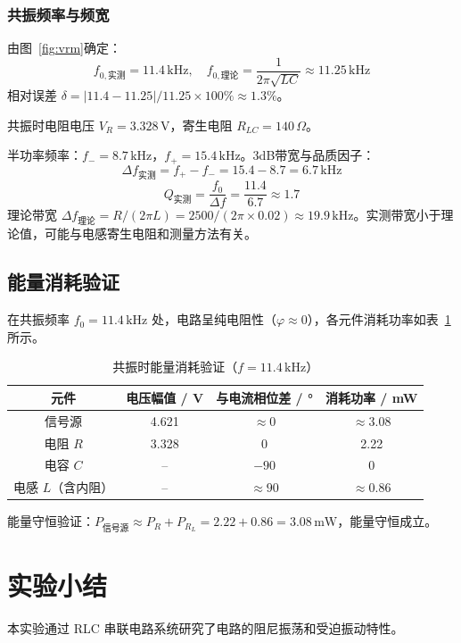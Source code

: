 \documentclass[UTF8]{article}
\begin{document}
\subsubsection{共振频率与频宽}

由图~\ref{fig:vrm}确定：
\[
f_{0,\text{实测}} = 11.4\,\mathrm{kHz}, \quad f_{0,\text{理论}} = \frac{1}{2\pi\sqrt{LC}} \approx 11.25\,\mathrm{kHz}
\]
相对误差 $\delta = |11.4 - 11.25|/11.25 \times 100\% \approx 1.3\%$。

共振时电阻电压 $V_R = 3.328\,\mathrm{V}$，寄生电阻 $R_{LC} = 140\,\Omega$。

半功率频率：$f_- = 8.7\,\mathrm{kHz}$，$f_+ = 15.4\,\mathrm{kHz}$。3dB带宽与品质因子：
\[
\Delta f_{\text{实测}} = f_+ - f_- = 15.4 - 8.7 = 6.7\,\mathrm{kHz}
\]
\[
Q_{\text{实测}} = \frac{f_0}{\Delta f} = \frac{11.4}{6.7} \approx 1.7
\]
理论带宽 $\Delta f_{\text{理论}} = R/(2\pi L) = 2500/(2\pi \times 0.02) \approx 19.9\,\mathrm{kHz}$。实测带宽小于理论值，可能与电感寄生电阻和测量方法有关。

\subsection{能量消耗验证}

在共振频率 $f_0 = 11.4\,\mathrm{kHz}$ 处，电路呈纯电阻性（$\varphi \approx 0$），各元件消耗功率如表~\ref{tab:energy}所示。

\begin{table}[h]
\centering
\caption{共振时能量消耗验证（$f = 11.4\,\mathrm{kHz}$）}
\label{tab:energy}
\begin{tabular}{cccc}
\toprule
元件 & 电压幅值 / V & 与电流相位差 / ° & 消耗功率 / mW \\
\midrule
信号源 & 4.621 & $\approx 0$ & $\approx 3.08$ \\
电阻 $R$ & 3.328 & 0 & 2.22 \\
电容 $C$ & -- & $-90$ & 0 \\
电感 $L$（含内阻） & -- & $\approx 90$ & $\approx 0.86$ \\
\bottomrule
\end{tabular}
\end{table}

能量守恒验证：$P_{\text{信号源}} \approx P_R + P_{R_L} = 2.22 + 0.86 = 3.08\,\mathrm{mW}$，能量守恒成立。

\section{实验小结}
本实验通过 RLC 串联电路系统研究了电路的阻尼振荡和受迫振动特性。
\end{document}
